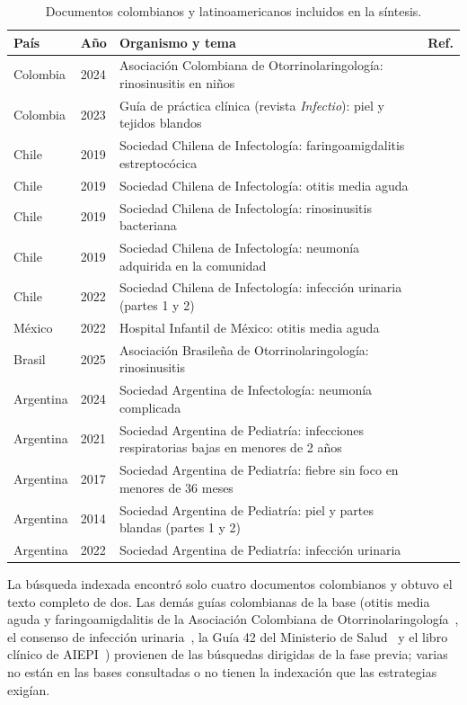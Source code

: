 \documentclass[11pt,a4paper]{article}
\begin{document}
\begin{table}[htbp]
\centering
\caption{Documentos colombianos y latinoamericanos incluidos en la síntesis.}
\label{tab:latam}
\small
\begin{tabularx}{\textwidth}{@{}llXr@{}}
\toprule
País & Año & Organismo y tema & Ref. \\
\midrule
Colombia & 2024 & Asociación Colombiana de Otorrinolaringología: rinosinusitis en niños & \citep{acorlrs2024} \\
Colombia & 2023 & Guía de práctica clínica (revista \emph{Infectio}): piel y tejidos blandos & \citep{acin2023} \\
Chile & 2019 & Sociedad Chilena de Infectología: faringoamigdalitis estreptocócica & \citep{chilefaa2019} \\
Chile & 2019 & Sociedad Chilena de Infectología: otitis media aguda & \citep{chileoma2019} \\
Chile & 2019 & Sociedad Chilena de Infectología: rinosinusitis bacteriana & \citep{chilers2019} \\
Chile & 2019 & Sociedad Chilena de Infectología: neumonía adquirida en la comunidad & \citep{chilenac2019} \\
Chile & 2022 & Sociedad Chilena de Infectología: infección urinaria (partes 1 y 2) & \citep{chileitu2022} \\
México & 2022 & Hospital Infantil de México: otitis media aguda & \citep{mexicooma2022} \\
Brasil & 2025 & Asociación Brasileña de Otorrinolaringología: rinosinusitis & \citep{brasilrs2025} \\
Argentina & 2024 & Sociedad Argentina de Infectología: neumonía complicada & \citep{sadi2024} \\
Argentina & 2021 & Sociedad Argentina de Pediatría: infecciones respiratorias bajas en menores de 2 años & \citep{sapiras2021} \\
Argentina & 2017 & Sociedad Argentina de Pediatría: fiebre sin foco en menores de 36 meses & \citep{sapfiebre2017} \\
Argentina & 2014 & Sociedad Argentina de Pediatría: piel y partes blandas (partes 1 y 2) & \citep{sappiel2014a,sappiel2014} \\
Argentina & 2022 & Sociedad Argentina de Pediatría: infección urinaria & \citep{sapitu2022} \\
\bottomrule
\end{tabularx}
\end{table}

La búsqueda indexada encontró solo cuatro documentos colombianos y obtuvo el texto completo de dos. Las demás guías colombianas de la base (otitis media aguda y faringoamigdalitis de la Asociación Colombiana de Otorrinolaringología~\citep{acorloma2024,acorlfaa2024}, el consenso de infección urinaria~\citep{itucol2023}, la Guía 42 del Ministerio de Salud~\citep{gpc42} y el libro clínico de AIEPI~\citep{aiepi2012}) provienen de las búsquedas dirigidas de la fase previa; varias no están en las bases consultadas o no tienen la indexación que las estrategias exigían.
\end{document}
